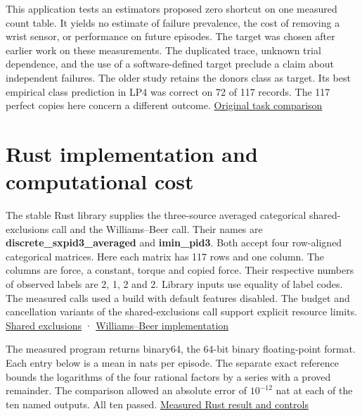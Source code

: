 This application tests an estimator\textquotesingle s proposed zero shortcut on one measured count table. It yields no estimate of failure prevalence, the cost of removing a wrist sensor, or performance on future episodes. The target was chosen after earlier work on these measurements. The duplicated trace, unknown trial dependence, and the use of a software-defined target preclude a claim about independent failures. The older study retains the donor\textquotesingle s class as target. Its best empirical class prediction in LP4 was correct on 72 of 117 records. The 117 perfect copies here concern a different outcome. \href{https://github.com/sepahead/pid-rs/blob/main/audit/research/robot-wrist-slope-signs/EXPOSITION.md}{Original task comparison}

\clearpage

\section{Rust implementation and computational cost}\label{rust-implementation-and-computational-cost}

The stable Rust library supplies the three-source averaged categorical shared-exclusions call and the Williams--Beer call. Their names are \textbf{discrete\_sxpid3\_averaged} and \textbf{imin\_pid3}. Both accept four row-aligned categorical matrices. Here each matrix has 117 rows and one column. The columns are force, a constant, torque and copied force. Their respective numbers of observed labels are 2, 1, 2 and 2. Library inputs use equality of label codes. The measured calls used a build with default features disabled. The budget and cancellation variants of the shared-exclusions call support explicit resource limits. \href{https://github.com/sepahead/pid-rs/blob/6a9f087be84bc21a89ff51e7da8e626e6883d73e/crates/pid-core/src/sxpid.rs}{Shared exclusions} · \href{https://github.com/sepahead/pid-rs/blob/6a9f087be84bc21a89ff51e7da8e626e6883d73e/crates/pid-core/src/discrete_pid.rs}{Williams--Beer implementation}

The measured program returns binary64, the 64-bit binary floating-point format. Each entry below is a mean in nats per episode. The separate exact reference bounds the logarithms of the four rational factors by a series with a proved remainder. The comparison allowed an absolute error of \(10^{-12}\) nat at each of the ten named outputs. All ten passed. \href{https://github.com/sepahead/pid-rs/blob/main/audit/research/robot-wrist-copied-target/rust/README.md}{Measured Rust result and controls}

